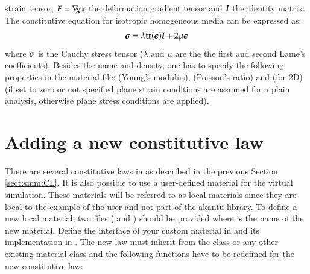 strain tensor, $\boldsymbol{F} = \nabla_{\!\!\boldsymbol{X}}\boldsymbol{x}$ the deformation
gradient tensor and $\boldsymbol{I}$ the identity matrix. The constitutive
equation for isotropic homogeneous media can be expressed as:
\begin{equation}\label{eqn:smm:material:constitutive_elastic}
\boldsymbol{\sigma } =\lambda\mathrm{tr}(\boldsymbol{\epsilon})\boldsymbol{I}+2 \mu
\boldsymbol{\epsilon}
\end{equation} where $\boldsymbol{\sigma}$ is the Cauchy stress tensor
($\lambda$ and $\mu$ are the the first and second Lame's
coefficients). Besides the name and density, one has to specify the
following properties in the material file:  (Young's modulus),
 (Poisson's ratio) and (for 2D)  (if set
to zero or not specified plane strain conditions are assumed for a
plain analysis, otherwise plane stress conditions are applied).




\section{Adding a new constitutive law}

There are several constitutive laws in \akantu as described in the
previous Section \ref{sect:smm:CL}. It is also possible to use a
user-defined material for the virtual simulation. These materials will
be referred to as local materials since they are local to the example
of the user and not part of the akantu library.  To define a new local
material, two files ( and
) should be provided where  is the
name of the new material. Define the interface of your custom material
in  and its implementation in
.  The new law must inherit from the
 class or any other existing material class and the
following functions have to be redefined for the new constitutive law:


